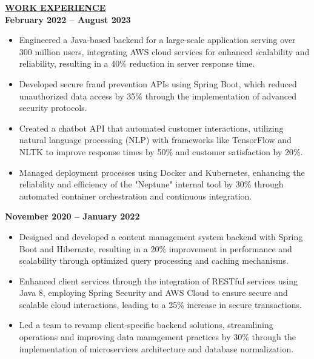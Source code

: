 \documentclass{article}
\begin{document}

\noindent \textbf{\underline{WORK EXPERIENCE}} \\
 \hfill \textbf{February 2022 – August 2023}
\begin{itemize}[noitemsep,nolistsep,leftmargin=*]
    \item Engineered a Java-based backend for a large-scale application serving over 300 million users, integrating AWS cloud services for enhanced scalability and reliability, resulting in a 40\% reduction in server response time.
    \item Developed secure fraud prevention APIs using Spring Boot, which reduced unauthorized data access by 35\% through the implementation of advanced security protocols.
    \item Created a chatbot API that automated customer interactions, utilizing natural language processing (NLP) with frameworks like TensorFlow and NLTK to improve response times by 50\% and customer satisfaction by 20\%.
    \item Managed deployment processes using Docker and Kubernetes, enhancing the reliability and efficiency of the "Neptune" internal tool by 30\% through automated container orchestration and continuous integration.
\end{itemize}

 \hfill \textbf{November 2020 – January 2022}
\begin{itemize}[noitemsep,nolistsep,leftmargin=*]
    \item Designed and developed a content management system backend with Spring Boot and Hibernate, resulting in a 20\% improvement in performance and scalability through optimized query processing and caching mechanisms.
    \item Enhanced client services through the integration of RESTful services using Java 8, employing Spring Security and AWS Cloud to ensure secure and scalable cloud interactions, leading to a 25\% increase in secure transactions.
    \item Led a team to revamp client-specific backend solutions, streamlining operations and improving data management practices by 30\% through the implementation of microservices architecture and database normalization.
\end{itemize}
\end{document}
